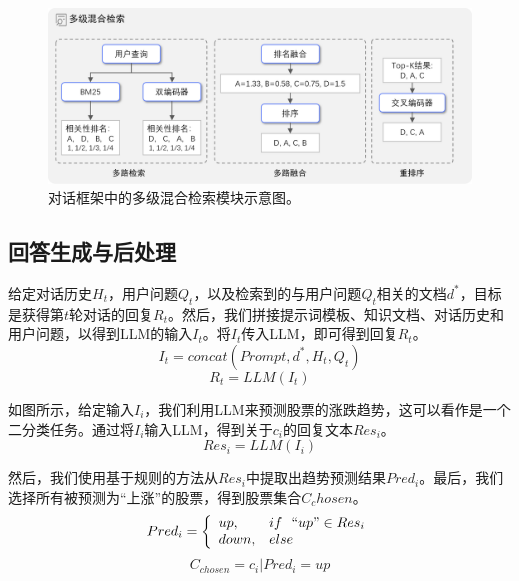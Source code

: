 
\begin{figure}[htbp]
	\centering
	\includegraphics[scale=0.55]{Fig/search_module.png}
	\caption{\label{search_module}对话框架中的多级混合检索模块示意图。}
\end{figure}

\subsection{回答生成与后处理}

给定对话历史$H_t$，用户问题$Q_t$，以及检索到的与用户问题$Q_t$相关的文档$d^*$，目标是获得第$t$轮对话的回复$R_t$。然后，我们拼接提示词模板、知识文档、对话历史和用户问题，以得到LLM的输入$I_t$。将$I_t$传入LLM，即可得到回复$R_t$。
\begin{equation}
	I_t = concat(Prompt, d^*, H_t, Q_t)
\end{equation}
\begin{equation}
	R_t = LLM(I_t)
\end{equation}

如图所示，给定输入$I_i$，我们利用LLM来预测股票的涨跌趋势，这可以看作是一个二分类任务。通过将$I_i$输入LLM，得到关于$c_i$的回复文本$Res_i$。
\begin{equation}
	Res_i = LLM(I_i)
\end{equation}

然后，我们使用基于规则的方法从$Res_i$中提取出趋势预测结果$Pred_i$。最后，我们选择所有被预测为“上涨”的股票，得到股票集合$C_chosen$。
\begin{equation}
    Pred_i = \left\{ 
        \begin{array}{ll}
            up, & if\ \ ``up" \in Res_i \\
            down, & else \\
        \end{array}
    \right.
\end{equation}
\begin{equation}
	C_{chosen}={c_i | Pred_i = up}
\end{equation}

